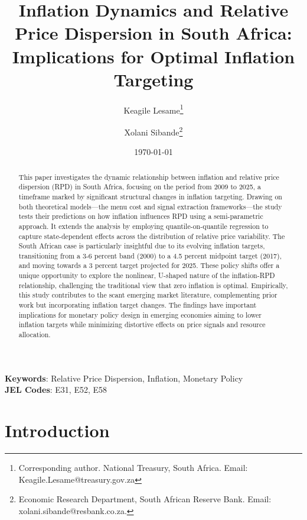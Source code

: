 \documentclass[
  letterpaper,
  DIV=11,
  numbers=noendperiod]{scrartcl}
\author{}
\date{}
\begin{document}
\title{Inflation Dynamics and Relative Price Dispersion in South Africa: Implications for Optimal Inflation Targeting}
\author {Keagile Lesame\footnote{Corresponding author. National Treasury, South Africa. Email: Keagile.Lesame@treasury.gov.za} \and
Xolani Sibande\footnote{Economic Research Department, South African Reserve Bank. Email: xolani.sibande@resbank.co.za.}}


\date{\today}
\maketitle

\begin{abstract}
This paper investigates the dynamic relationship between inflation and relative price dispersion (RPD) in South Africa, focusing on the period from 2009 to 2025, a timeframe marked by significant structural changes in inflation targeting. Drawing on both theoretical models—the menu cost and signal extraction frameworks—the study tests their predictions on how inflation influences RPD using a semi-parametric approach. It extends the analysis by employing quantile-on-quantile regression to capture state-dependent effects across the distribution of relative price variability. The South African case is particularly insightful due to its evolving inflation targets, transitioning from a 3-6 percent band (2000) to a 4.5 percent midpoint target (2017), and moving towards a 3 percent target projected for 2025. These policy shifts offer a unique opportunity to explore the nonlinear, U-shaped nature of the inflation-RPD relationship, challenging the traditional view that zero inflation is optimal. Empirically, this study contributes to the scant emerging market literature, complementing prior work but incorporating inflation target changes. The findings have important implications for monetary policy design in emerging economies aiming to lower inflation targets while minimizing distortive effects on price signals and resource allocation.
\end{abstract}

\noindent\textbf{Keywords}: Relative Price Dispersion, Inflation, Monetary Policy\\
\textbf{JEL Codes}: E31, E52, E58
\newpage

\section{Introduction}\label{introduction}
\end{document}
